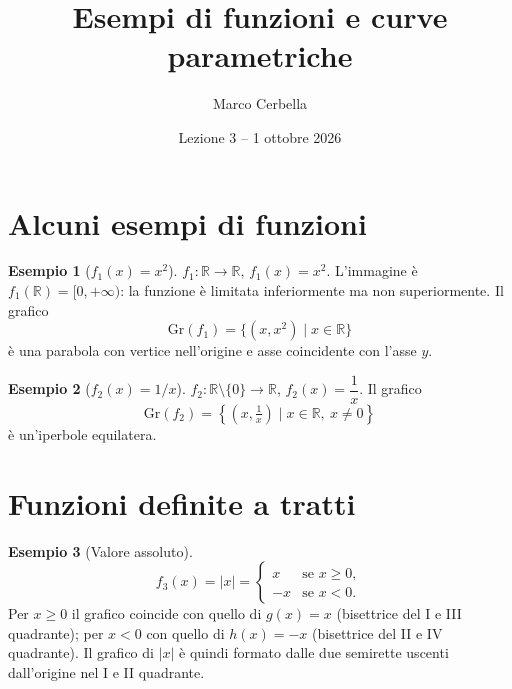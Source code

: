 \documentclass[11pt,a4paper]{article}
\title{Esempi di funzioni e curve parametriche}
\author{Marco Cerbella}
\date{Lezione 3 -- 1 ottobre 2026}
\theoremstyle{definition}
\newtheorem*{esempio}{Esempio}
\begin{document}
\maketitle

\section{Alcuni esempi di funzioni}

\begin{esempio}[$f_1(x) = x^2$]
$f_1 : \mathbb{R} \to \mathbb{R}$, $f_1(x) = x^2$. L'immagine è $f_1(\mathbb{R}) = [0, +\infty)$: la funzione è limitata inferiormente ma non superiormente. Il grafico
\[
\mathrm{Gr}(f_1) = \{(x, x^2) \mid x \in \mathbb{R}\}
\]
è una parabola con vertice nell'origine e asse coincidente con l'asse $y$.
\end{esempio}

\begin{esempio}[$f_2(x) = 1/x$]
$f_2 : \mathbb{R} \setminus \{0\} \to \mathbb{R}$, $f_2(x) = \dfrac1x$. Il grafico
\[
\mathrm{Gr}(f_2) = \left\{\left(x, \tfrac1x\right) \mid x \in \mathbb{R},\ x \neq 0\right\}
\]
è un'iperbole equilatera.
\end{esempio}

\begin{center}
\end{center}

\section{Funzioni definite a tratti}

\begin{esempio}[Valore assoluto]
\[
f_3(x) = |x| = \begin{cases} x & \text{se } x \geq 0, \\ -x & \text{se } x < 0. \end{cases}
\]
Per $x \geq 0$ il grafico coincide con quello di $g(x) = x$ (bisettrice del I e III quadrante); per $x < 0$ con quello di $h(x) = -x$ (bisettrice del II e IV quadrante). Il grafico di $|x|$ è quindi formato dalle due semirette uscenti dall'origine nel I e II quadrante.
\end{esempio}
\end{document}
